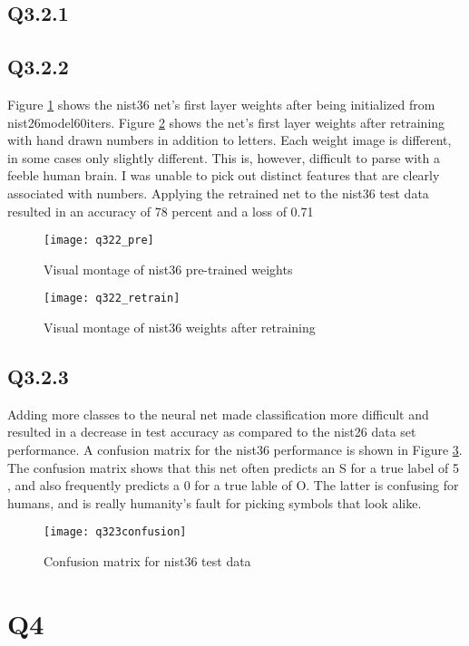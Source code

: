 \documentclass[12pt]{article}
\begin{document}
\subsection{Q3.2.1}
\subsection{Q3.2.2}
Figure \ref{fig:nist36preweights} shows the nist36 net's first layer weights after being initialized from nist26model60iters. Figure \ref{fig:nist36retrainweights} shows the net's first layer weights after retraining with hand drawn numbers in addition to letters.
Each weight image is different, in some cases only slightly different. This is, however, difficult to parse with a feeble human brain. I was unable to pick out distinct features that are clearly associated with numbers.
Applying the retrained net to the nist36 test data resulted in an accuracy of 78 percent and a loss of 0.71
\begin{figure}[H]
\centering
\texttt{[image: q322\_pre]}
\caption{ Visual montage of nist36 pre-trained weights } 
\label{fig:nist36preweights}
\end{figure}   

\begin{figure}[H]
\centering
\texttt{[image: q322\_retrain]}
\caption{ Visual montage of nist36 weights after retraining } 
\label{fig:nist36retrainweights}
\end{figure}   

\subsection{Q3.2.3}
Adding more classes to the neural net made classification more difficult and resulted in a decrease in test accuracy as compared to the nist26 data set performance. A confusion matrix for the nist36 performance is shown in Figure \ref{fig:nist36confusion}. The confusion matrix shows that this net often predicts an S for a true label of 5 , and also frequently predicts a 0 for a true lable of O. The latter is confusing for humans, and is really humanity's fault for picking symbols that look alike.
\begin{figure}[H]
\centering
\texttt{[image: q323confusion]}
\caption{ Confusion matrix for nist36 test data } 
\label{fig:nist36confusion}
\end{figure}   

\section{Q4}
\end{document}
